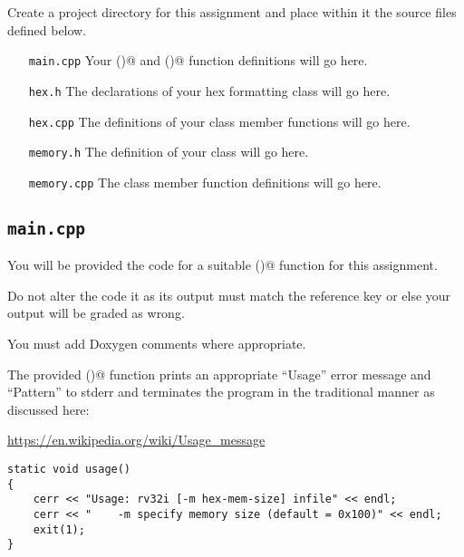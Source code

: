 \documentclass[11pt]{article}
\begin{document}
Create a project directory for this assignment and place within it the source files defined below.

\begin{itemize}
\item[\tt main.cpp] Your \verb@main()@ and \verb@usage()@ function definitions will go here.
\item[\tt hex.h] The declarations of your hex formatting class will go here.
\item[\tt hex.cpp] The definitions of your \verb@hex@ class member functions will go here.
\item[\tt memory.h] The definition of your \verb@memory@ class will go here.
\item[\tt memory.cpp] The \verb@memory@ class member function definitions will go here.
\end{itemize}

\subsection{\tt main.cpp}

You will be provided the code for a suitable \verb@main()@ function for this 
assignment.

Do not alter the code it as its output must match the reference key or else 
your output will be graded as wrong.

You must add Doxygen comments where appropriate.

The provided \verb@usage()@ function prints an appropriate ``Usage'' error message 
and ``Pattern'' to stderr and terminates the program in the traditional manner 
as discussed here:

\url{https://en.wikipedia.org/wiki/Usage_message}

\begin{minipage}{\textwidth}
\begin{lstlisting}[frame=single, title={usage() Function}]
static void usage()
{
    cerr << "Usage: rv32i [-m hex-mem-size] infile" << endl;
    cerr << "    -m specify memory size (default = 0x100)" << endl;
    exit(1);
}
\end{lstlisting}
\end{minipage}
\end{document}
